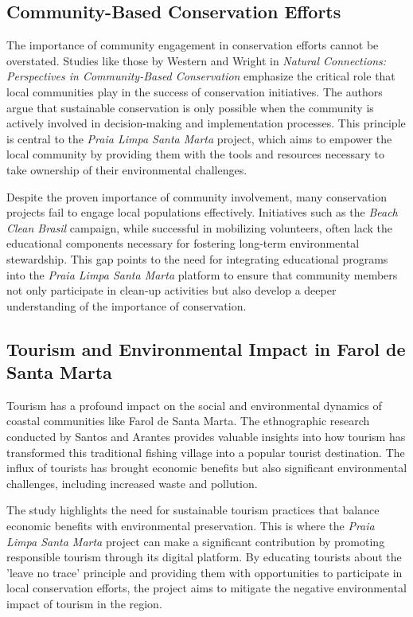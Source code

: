 \subsection{Community-Based Conservation Efforts}

The importance of community engagement in conservation efforts cannot be overstated. Studies like those by Western and Wright\cite{western1994} in \textit{Natural Connections: Perspectives in Community-Based Conservation} emphasize the critical role that local communities play in the success of conservation initiatives. The authors argue that sustainable conservation is only possible when the community is actively involved in decision-making and implementation processes. This principle is central to the \textit{Praia Limpa Santa Marta} project, which aims to empower the local community by providing them with the tools and resources necessary to take ownership of their environmental challenges.

Despite the proven importance of community involvement, many conservation projects fail to engage local populations effectively. Initiatives such as the \textit{Beach Clean Brasil} campaign, while successful in mobilizing volunteers, often lack the educational components necessary for fostering long-term environmental stewardship. This gap points to the need for integrating educational programs into the \textit{Praia Limpa Santa Marta} platform to ensure that community members not only participate in clean-up activities but also develop a deeper understanding of the importance of conservation.

\subsection{Tourism and Environmental Impact in Farol de Santa Marta}

Tourism has a profound impact on the social and environmental dynamics of coastal communities like Farol de Santa Marta. The ethnographic research conducted by Santos and Arantes\cite{dosSantos2010} provides valuable insights into how tourism has transformed this traditional fishing village into a popular tourist destination. The influx of tourists has brought economic benefits but also significant environmental challenges, including increased waste and pollution.

The study highlights the need for sustainable tourism practices that balance economic benefits with environmental preservation. This is where the \textit{Praia Limpa Santa Marta} project can make a significant contribution by promoting responsible tourism through its digital platform. By educating tourists about the 'leave no trace' principle and providing them with opportunities to participate in local conservation efforts, the project aims to mitigate the negative environmental impact of tourism in the region.

